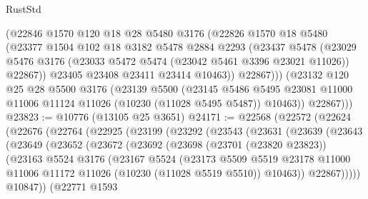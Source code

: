 \begin{lexlean}{RustStd}
\begin{coremodule}
            (@22846
              @1570
              @120
              @18
              @28
              @5480
              @3176
              (@22826
                @1570
                @18
                @5480
                (@23377
                  @1504
                  @102
                  @18
                  @3182
                  @5478
                  @2884
                  @2293
                  (@23437
                    @5478
                    (@23029
                      @5476
                      @3176
                      (@23033 @5472 @5474 (@23042 @5461 @3396 @23021 @11026))
                      @22867))
                  @23405
                  @23408
                  @23411
                  @23414
                  @10463))
              @22867)))
        (@23132
          @120
          @25
          @28
          @5500
          @3176
          (@23139
            @5500
            (@23145
              @5486
              @5495
              @23081
              @11000
              @11006
              @11124
              @11026
              (@10230 (@11028 @5495 @5487))
              @10463))
          @22867)))
@23823 := @10776 (@13105 @25 @3651)
@24171 := @22568
    (@22572
      (@22624
        (@22676
          (@22764
            (@22925
              (@23199
                (@23292
                  (@23543
                    (@23631
                      (@23639
                        (@23643
                          (@23649
                            (@23652
                              (@23672
                                (@23692
                                  (@23698
                                    (@23701 (@23820 @23823))
                                    (@23163
                                      @5524
                                      @3176
                                      (@23167
                                        @5524
                                        (@23173
                                          @5509
                                          @5519
                                          @23178
                                          @11000
                                          @11006
                                          @11172
                                          @11026
                                          (@10230 (@11028 @5519 @5510))
                                          @10463))
                                      @22867)))))
                            @10847))
                        (@22771
                          @1593

\end{coremodule}
\end{lexlean}

